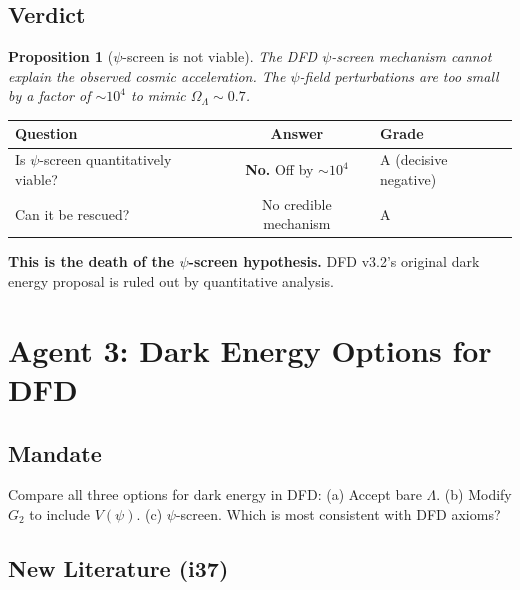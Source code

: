 \documentclass[11pt,a4paper]{article}
\newtheorem{proposition}{Proposition}
\begin{document}
\subsection{Verdict}

\begin{proposition}[$\psi$-screen is not viable]
The DFD $\psi$-screen mechanism cannot explain the observed cosmic acceleration. The $\psi$-field perturbations are too small by a factor of $\sim 10^4$ to mimic $\Omega_\Lambda \sim 0.7$.
\end{proposition}

\begin{center}
\begin{tabular}{lcl}
\toprule
\textbf{Question} & \textbf{Answer} & \textbf{Grade} \\
\midrule
Is $\psi$-screen quantitatively viable? & \textbf{No.} Off by $\sim 10^4$ & A (decisive negative) \\
Can it be rescued? & No credible mechanism & A \\
\bottomrule
\end{tabular}
\end{center}

\textbf{This is the death of the $\psi$-screen hypothesis.} DFD v3.2's original dark energy proposal is ruled out by quantitative analysis.

\newpage
\section{Agent 3: Dark Energy Options for DFD}
\label{sec:agent3}

\subsection{Mandate}

Compare all three options for dark energy in DFD: (a) Accept bare $\Lambda$. (b) Modify $G_2$ to include $V(\psi)$. (c) $\psi$-screen. Which is most consistent with DFD axioms?

\subsection{New Literature (i37)}
\end{document}
